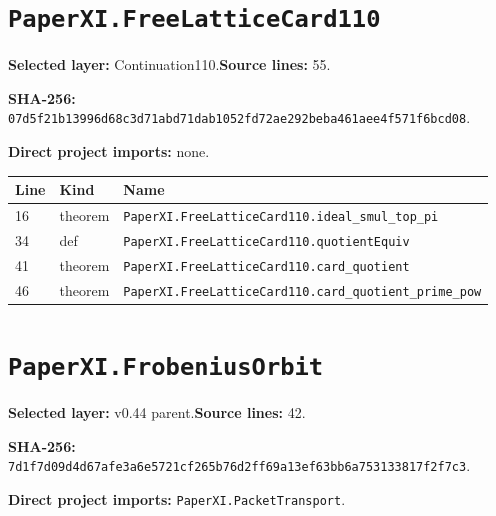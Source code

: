 \documentclass[10pt,oneside]{book}
\begin{document}
\section{\texorpdfstring{\nolinkurl{PaperXI.FreeLatticeCard110}}{PaperXI.FreeLatticeCard110}}\label{module:PaperXI.FreeLatticeCard110}

\textbf{Selected layer:} Continuation110.\quad\textbf{Source lines:} 55.\par\textbf{SHA-256:} {\scriptsize\nolinkurl{07d5f21b13996d68c3d71abd71dab1052fd72ae292beba461aee4f571f6bcd08}}.


\textbf{Direct project imports:} none.

\begin{longtable}{@{}p{}p{}p{}@{}}\toprule Line&Kind&Name\\\midrule\endhead

16&theorem&\nolinkurl{PaperXI.FreeLatticeCard110.ideal_smul_top_pi}\\

34&def&\nolinkurl{PaperXI.FreeLatticeCard110.quotientEquiv}\\

41&theorem&\nolinkurl{PaperXI.FreeLatticeCard110.card_quotient}\\

46&theorem&\nolinkurl{PaperXI.FreeLatticeCard110.card_quotient_prime_pow}\\

\bottomrule\end{longtable}

\section{\texorpdfstring{\nolinkurl{PaperXI.FrobeniusOrbit}}{PaperXI.FrobeniusOrbit}}\label{module:PaperXI.FrobeniusOrbit}

\textbf{Selected layer:} v0.44 parent.\quad\textbf{Source lines:} 42.\par\textbf{SHA-256:} {\scriptsize\nolinkurl{7d1f7d09d4d67afe3a6e5721cf265b76d2ff69a13ef63bb6a753133817f2f7c3}}.


\textbf{Direct project imports:} \nolinkurl{PaperXI.PacketTransport}.
\end{document}
